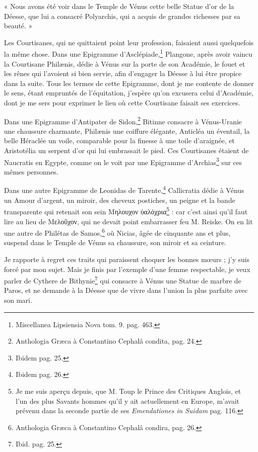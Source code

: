 \documentclass[a4paper, 18pt, oneside]{article}
\begin{document}
« Nous avons été voir dans le Temple de Vénus cette belle Statue d'or de la Déesse, que lui a consacré Polyarchis, qui a acquis de grandes richesses par sa beauté. »

Les Courtisanes, qui ne quittaient point leur profession, faisaient aussi quelquefois la même chose. Dans une Epigramme d'Asclépiade,\footnote{Miscellanea Lipsiensia Nova tom. 9. pag. 463.} Plangone, après avoir vaincu la Courtisane Philænis, dédie à Vénus sur la porte de son Académie, le fouet et les rênes qui l'avoient si bien servie, afin d'engager la Déesse à lui être propice dans la suite. Tous les termes de cette Epigramme, dont je me contente de donner le sens, étant empruntés de l'équitation, j'espère qu'on excusera celui d'Académie, dont je me sers pour exprimer le lieu où cette Courtisane faisait ses exercices.

Dans une Epigramme d'Antipater de Sidon,\footnote{Anthologia Græca à Constantino Cephalâ condita, pag. 24.} Bitinne consacre à Vénus-Uranie une chaussure charmante, Philænis une coiffure élégante, Anticléa un éventail, la belle Héraclée un voile, comparable pour la finesse à une toile d'araignée, et Aristotélia un serpent d'or qui lui embrassait le pied. Ces Courtisanes étaient de Naucratis en Egypte, comme on le voit par une Epigramme d'Archias\footnote{Ibidem pag. 25.} sur ces mêmes personnes.

Dans une autre Epigramme de Leonidas de Tarente,\footnote{Ibidem pag. 26.} Callicratia dédie à Vénus un Amour d'argent, un miroir, des cheveux postiches, un peigne et la bande transparente qui retenait son sein Μηλουχον ὑαλόχρια\footnote{Je me suis aperçu depuis, que M. Toup le Prince des Critiques Anglois, et l'un des plus Savants hommes qu'il y ait actuellement en Europe, m'avait prévenu dans la seconde partie de ses \emph{Emendationes in Suidam} pag. 116.} : car c'est ainsi qu'il faut lire au lieu de Μελοῦχον, qui ne devait point embarrasser feu M. Reiske. On en lit une autre de Philétas de Samos,\footnote{Anthologia Græca à Constantino Cephalâ condira, pag. 26.} où Nicias, âgée de cinquante ans et plus, suspend dans le Temple de Vénus sa chaussure, son miroir et sa ceinture.

Je rapporte à regret ces traits qui paraissent choquer les bonnes mœurs ; j'y suis forcé par mon sujet. Mais je finis par l'exemple d'une femme respectable, je veux parler de Cythere de Bithynie\footnote{Ibid. pag. 25.} qui consacre à Vénus une Statue de marbre de Paros, et ne demande à la Déesse que de vivre dans l'union la plus parfaite avec son mari.
\end{document}

